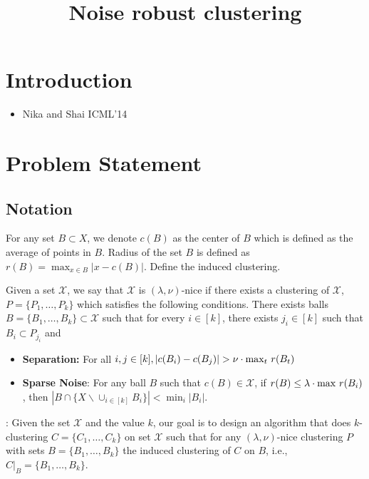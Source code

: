 \documentclass[11pt]{article}
\title{\LARGE Noise robust clustering}
\author{}
\begin{document}
\maketitle

\section{Introduction}
\begin{itemize}
\item Nika and Shai ICML'14
\end{itemize}

\section{Problem Statement}

\subsection{Notation}
For any set $B\subset X$, we denote $c(B)$ as the center of $B$ which is defined as the average of points in $B$. Radius of the set $B$ is defined as $r(B)=\max_{x\in B} |x-c(B)|$. Define the induced clustering.

\begin{definition}
Given a set $\mathcal{X}$, we say that $\mathcal{X}$ is $(\lambda,\nu)$-nice if there exists a clustering of $\mathcal{X}$, $P=\{P_1,\ldots,P_k\}$ which satisfies the following conditions. There exists balls $B=\{B_1,\ldots,B_k\}\subset \mathcal{X}$ such that for every $i\in[k]$, there exists $j_i\in[k]$ such that $B_i\subset P_{j_i}$ and
\begin{itemize}
\item{\bf{Separation}:} For all $i,j\in[k], |c(B_i)-c(B_j)| > \nu\cdot\max_t \thinspace r(B_t)$
\item{\bf{Sparse Noise}}: For any ball $B$ such that $c(B)\in \mathcal{X}$, if $r(B)\leq \lambda \cdot \max \thinspace r(B_i)$, then $|B\cap \{X \backslash \cup_{i\in[k]} B_i\}| < \min_i |B_i|$.
\end{itemize}
\end{definition}

: Given the set $\mathcal{X}$ and the value $k$, our goal is to design an algorithm that does $k$-clustering $C=\{C_1,\ldots,C_k\}$ on set $\mathcal{X}$ such that  for any $(\lambda,\nu)$-nice clustering $P$ with sets $B = \{B_1,\ldots,B_k\}$ the induced clustering of $C$ on $B$, i.e., $C|_B = \{B_1,\ldots,B_k\}$. 
\end{document}
